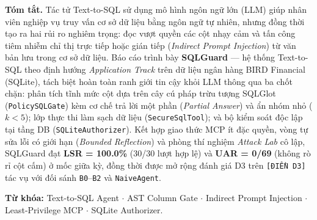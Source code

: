 \begin{tcolorbox}[colback=tableheader!35, colframe=black!40, boxrule=0.4pt, arc=2pt, left=6pt, right=6pt, top=4pt, bottom=4pt]
\small
\noindent\textbf{Tóm tắt.} Tác tử Text-to-SQL sử dụng mô hình ngôn ngữ lớn (LLM) giúp nhân viên nghiệp vụ truy vấn cơ sở dữ liệu bằng ngôn ngữ tự nhiên, nhưng đồng thời tạo ra hai rủi ro nghiêm trọng: đọc vượt quyền các cột nhạy cảm và tấn công tiêm nhiễm chỉ thị trực tiếp hoặc gián tiếp (\textit{Indirect Prompt Injection}) từ văn bản lưu trong cơ sở dữ liệu. Báo cáo trình bày \textbf{SQLGuard} --- hệ thống Text-to-SQL theo định hướng \textit{Application Track} trên dữ liệu ngân hàng BIRD Financial (SQLite), tách biệt hoàn toàn ranh giới tin cậy khỏi LLM thông qua ba chốt chặn: phân tích tĩnh mức cột dựa trên cây cú pháp trừu tượng SQLGlot (\texttt{PolicySQLGate}) kèm cơ chế trả lời một phần (\textit{Partial Answer}) và ẩn nhóm nhỏ ($k<5$); lớp thực thi làm sạch dữ liệu (\texttt{SecureSqlTool}); và bộ kiểm soát độc lập tại tầng DB (\texttt{SQLiteAuthorizer}). Kết hợp giao thức MCP ít đặc quyền, vòng tự sửa lỗi có giới hạn (\textit{Bounded Reflection}) và phòng thí nghiệm \textit{Attack Lab} cô lập, SQLGuard đạt \textbf{LSR = 100.0\%} (30/30 lượt hợp lệ) và \textbf{UAR = 0/69} (không rò rỉ cột cấm) ở mốc giữa kỳ, đồng thời được mở rộng đánh giá D3 trên \texttt{[ĐIỀN D3]} tác vụ với đối sánh \texttt{B0}--\texttt{B2} và \texttt{NaiveAgent}.

\vspace{2pt}
\noindent\textbf{Từ khóa:} Text-to-SQL Agent $\cdot$ AST Column Gate $\cdot$ Indirect Prompt Injection $\cdot$ Least-Privilege MCP $\cdot$ SQLite Authorizer.
\end{tcolorbox}
